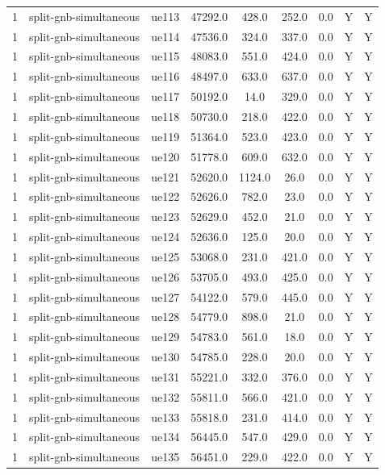 \begin{table}[ht]
\begin{tabular}{|c|c|c|c|c|c|c|c|c|}
1 & split-gnb-simultaneous & ue113 & 47292.0 & 428.0 & 252.0 & 0.0 & Y & Y \\
1 & split-gnb-simultaneous & ue114 & 47536.0 & 324.0 & 337.0 & 0.0 & Y & Y \\
1 & split-gnb-simultaneous & ue115 & 48083.0 & 551.0 & 424.0 & 0.0 & Y & Y \\
1 & split-gnb-simultaneous & ue116 & 48497.0 & 633.0 & 637.0 & 0.0 & Y & Y \\
1 & split-gnb-simultaneous & ue117 & 50192.0 & 14.0 & 329.0 & 0.0 & Y & Y \\
1 & split-gnb-simultaneous & ue118 & 50730.0 & 218.0 & 422.0 & 0.0 & Y & Y \\
1 & split-gnb-simultaneous & ue119 & 51364.0 & 523.0 & 423.0 & 0.0 & Y & Y \\
1 & split-gnb-simultaneous & ue120 & 51778.0 & 609.0 & 632.0 & 0.0 & Y & Y \\
1 & split-gnb-simultaneous & ue121 & 52620.0 & 1124.0 & 26.0 & 0.0 & Y & Y \\
1 & split-gnb-simultaneous & ue122 & 52626.0 & 782.0 & 23.0 & 0.0 & Y & Y \\
1 & split-gnb-simultaneous & ue123 & 52629.0 & 452.0 & 21.0 & 0.0 & Y & Y \\
1 & split-gnb-simultaneous & ue124 & 52636.0 & 125.0 & 20.0 & 0.0 & Y & Y \\
1 & split-gnb-simultaneous & ue125 & 53068.0 & 231.0 & 421.0 & 0.0 & Y & Y \\
1 & split-gnb-simultaneous & ue126 & 53705.0 & 493.0 & 425.0 & 0.0 & Y & Y \\
1 & split-gnb-simultaneous & ue127 & 54122.0 & 579.0 & 445.0 & 0.0 & Y & Y \\
1 & split-gnb-simultaneous & ue128 & 54779.0 & 898.0 & 21.0 & 0.0 & Y & Y \\
1 & split-gnb-simultaneous & ue129 & 54783.0 & 561.0 & 18.0 & 0.0 & Y & Y \\
1 & split-gnb-simultaneous & ue130 & 54785.0 & 228.0 & 20.0 & 0.0 & Y & Y \\
1 & split-gnb-simultaneous & ue131 & 55221.0 & 332.0 & 376.0 & 0.0 & Y & Y \\
1 & split-gnb-simultaneous & ue132 & 55811.0 & 566.0 & 421.0 & 0.0 & Y & Y \\
1 & split-gnb-simultaneous & ue133 & 55818.0 & 231.0 & 414.0 & 0.0 & Y & Y \\
1 & split-gnb-simultaneous & ue134 & 56445.0 & 547.0 & 429.0 & 0.0 & Y & Y \\
1 & split-gnb-simultaneous & ue135 & 56451.0 & 229.0 & 422.0 & 0.0 & Y & Y \\

\end{tabular}
\end{table}
